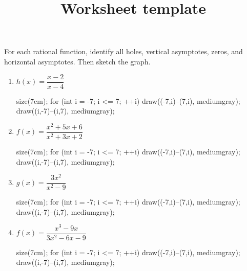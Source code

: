 \documentclass[12pt]{article}
\title{Worksheet template}
\begin{document}
\bigskip
\bigskip

For each rational function, identify all holes, vertical asymptotes, zeros, and horizontal asymptotes.  Then sketch the graph.

\begin{enumerate}

	\item $h(x) = \dfrac{x-2}{x-4}$
	\begin{flushleft}
	\begin{asy}
	size(7cm);
	for (int i = -7; i <= 7; ++i)
	{
    	draw((-7,i)--(7,i), mediumgray);
	    draw((i,-7)--(i,7), mediumgray);
    }
	\end{asy}
	\end{flushleft}
    
    
	\item $f(x) = \dfrac{x^2 + 5x + 6}{x^2 + 3x + 2}$
	\begin{flushleft}
	\begin{asy}
	size(7cm);
	for (int i = -7; i <= 7; ++i)
	{
    	draw((-7,i)--(7,i), mediumgray);
	    draw((i,-7)--(i,7), mediumgray);
    }
	\end{asy}
	\end{flushleft}
	
	\clearpage
    
	\item $g(x) = \dfrac{3x^2}{x^2 - 9}$
	\begin{flushleft}
	\begin{asy}
	size(7cm);
	for (int i = -7; i <= 7; ++i)
	{
    	draw((-7,i)--(7,i), mediumgray);
	    draw((i,-7)--(i,7), mediumgray);
    }
	\end{asy}
	\end{flushleft}

	\item $f(x) = \dfrac{x^3 - 9x}{3x^2 - 6x - 9}$
	\begin{flushleft}
	\begin{asy}
	size(7cm);
	for (int i = -7; i <= 7; ++i)
	{
    	draw((-7,i)--(7,i), mediumgray);
	    draw((i,-7)--(i,7), mediumgray);
    }
	\end{asy}
	\end{flushleft}

\end{enumerate}
\end{document}
